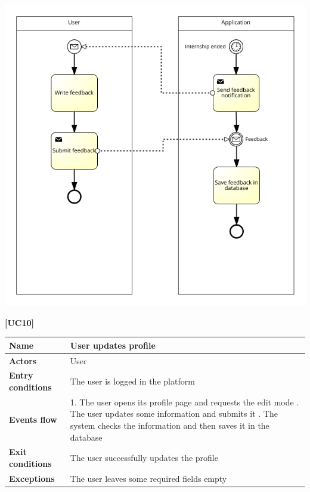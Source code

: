 \documentclass[11pt,twoside]{article}
\begin{document}
\begin{center}
\includegraphics[width=\textwidth]{Images/UC9}
\end{center}

\newpage

\large{\textbf{[UC10]}}
\begin{table}[H]
\begin{tabular}{| p{} | p{} |}
\hline
\textbf{Name}
& User updates profile \\
\hline
\textbf{Actors}
& User \\
\hline
\textbf{Entry conditions}
& The user is logged in the platform \\
\hline
\textbf{Events flow}
& 1. The user opens its profile page and requests the edit mode \newline
2. The user updates some information and submits it \newline
3. The system checks the information and then saves it in the database \\
\hline
\textbf{Exit conditions}
& The user successfully updates the profile \\
\hline
\textbf{Exceptions}
& The user leaves some required fields empty \\
\hline
\end{tabular}
\end{table}
\end{document}
